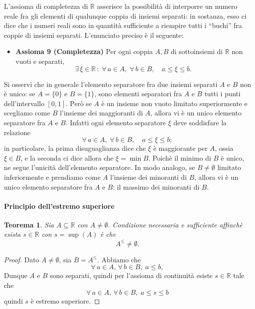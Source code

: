 \documentclass{article}
\theoremstyle{plain}
\newtheorem{thm}{Teorema}[section]
\theoremstyle{definition}
\theoremstyle{remark}
\begin{document}
\vspace{10pt}

L'assioma di completezza di $\mathbb{R}$ asserisce la possibilità di interporre un numero reale
fra gli elementi di qualunque coppia di insiemi separati: in sostanza, esso ci dice che i
numeri reali sono in quantità suﬃciente a riempire tutti i “buchi” fra coppie di insiemi
separati. L'enunciato preciso è il seguente:

\begin{itemize}
    \item[] \textbf{Assioma 9 (Completezza)} 
    Per ogni coppia $A, B$ di sottoinsiemi di $\mathbb{R}$ non vuoti e separati,
    \[\exists\,\xi\in\mathbb{R}\,:\;\forall\,a\in A,\;\forall\,b\in B,\quad a\leq\xi\leq b.\]
\end{itemize}

Si osservi che in generale l'elemento separatore fra due insiemi separati $A$ e $B$ non è unico: 
se $A = \{0\}$ e $B = \{1\}$, sono elementi separatori fra $A$ e $B$ tutti i punti dell'intervallo $[0,1]$. 
Però se $A$ è un insieme non vuoto limitato superiormente e scegliamo come $B$ l'insieme dei maggioranti di $A$, 
allora vi è un unico elemento separatore fra $A$ e $B$.
Infatti ogni elemento separatore $\xi$ deve soddisfare la relazione
\[\forall\,a\in A,\;\forall\,b\in B,\quad a\leq\xi\leq b;\]
in particolare, la prima disuguaglianza dice che $\xi$ è maggiorante per $A$, ossia $\xi \in B$, e la
seconda ci dice allora che $\xi = \min B$. Poichè il minimo di $B$ è unico, ne segue l'unicità
dell'elemento separatore. In modo analogo, se $B\neq\emptyset$ limitato inferiormente e prendiamo come $A$ l'insieme dei minoranti di $B$, 
allora vi è un unico elemento separatore fra $A$ e $B$: il massimo dei minoranti di $B$.

\vspace{10pt}

\paragraph{Principio dell'estremo superiore}
\begin{bxthm}
\begin{thm}
    Sia $A\subseteq\mathbb{R}$ con $A\neq\emptyset$. Condizione necessaria e sufficiente affinchè esista $s\in\mathbb{R}$ con $s=\sup(A)$ è che 
    \[
        A^{\leq}\neq\emptyset.
    \]
\end{thm}
\end{bxthm}
\begin{proof}
    Dato $A\neq\emptyset$, sia $B=A^{\leq}$.
    Abbiamo che \[\forall\, a\in A,\,\forall\, b\in B,\; a\leq b,\]
    Dunque $A$ e $B$ sono separati, quindi per l'assioma di continuità esiste $s\in\mathbb{R}$ tale che 
    \[\forall\,a\in A,\,\forall\, b\in B,\;a\leq s\leq b\] quindi $s$ è estremo superiore.
\end{proof}
\end{document}
